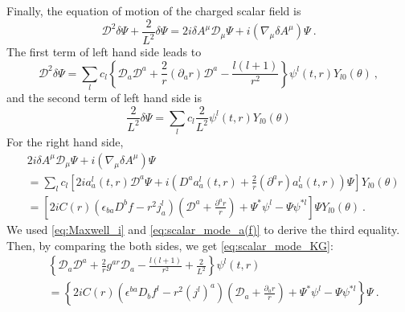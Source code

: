 \documentclass[a4paper,11pt]{article}
\begin{document}
    Finally, the equation of motion of the charged scalar field is 
    \begin{equation}
        \mathcal{D}^2\delta \Psi +\frac{2}{L^2}\delta \Psi=2i \delta A^\mu\mathcal{D}_\mu\Psi+i(\nabla_\mu\delta A^\mu)\Psi\ .
    \end{equation}
    The first term of left hand side leads to 
    \begin{equation}
        \mathcal{D}^2\delta \Psi
        =\sum_l c_l \left\{
        \mathcal{D}_a\mathcal{D}^a
        +\frac{2}{r}\left(\partial_a r\right)\mathcal{D}^a
        -\frac{l(l+1)}{r^2}
        \right\}\psi^l(t,r) Y_{l0}(\theta)\ ,
    \end{equation}
    and the second term of left hand side is
    \begin{equation}
        \frac{2}{L^2}\delta\Psi=\sum_l c_l \frac{2}{L^2}\psi^l(t,r) Y_{l0}(\theta)
    \end{equation}
    For the right hand side,
    \begin{align}
        \nonumber&
        2i\delta A^\mu\mathcal{D}_\mu\Psi+ i(\nabla_\mu\delta A^\mu)\Psi\\
        \nonumber&
        =\sum_l c_l \left[
        2ia^l_a(t,r)\mathcal{D}^a\Psi
        +i\left( D^a a^l_a(t,r)+\frac{2}{r}\left(\partial^a r\right)a^l_a(t,r)\right)\Psi
        \right]Y_{l0}(\theta)\\
        &
        =\left[
        2i C(r)\left(\epsilon_{ba}D^b f-r^2 j^l_a\right)\left(\mathcal{D}^a+\frac{\partial^a r}{r}\right)
        +\Psi^*\psi^l-\Psi\psi^{*l}
        \right]\Psi Y_{l0}(\theta)\ .
    \end{align}
    We used \eqref{eq:Maxwell_i} and \eqref{eq:scalar_mode_a(f)} to derive the third equality.
    Then, by comparing the both sides, we get \eqref{eq:scalar_mode_KG}:
    \begin{align}
        \nonumber&
        \left\{
        \mathcal{D}_a\mathcal{D}^a + \frac{2}{r}g^{ar}\mathcal{D}_a - \frac{l(l+1)}{r^2} + \frac{2}{L^2}
        \right\}\psi^l(t,r)\\
        &
        =\left\{
        2iC(r)\left(\epsilon^{ba}D_b f^l-r^2 (j^l)^a\right) \left(\mathcal{D}_a+\frac{\partial_a r}{r}\right)
        +\Psi^*\psi^l-\Psi\psi^{*l}\right\}\Psi\ .
    \end{align}





\end{document}
